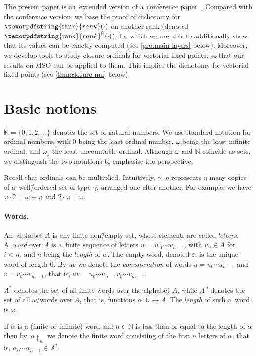 \documentclass[11pt,a4paper]{amsart}
\theoremstyle{plain}
\theoremstyle{definition}
\theoremstyle{defC}
\theoremstyle{thmC}
\theoremstyle{plain}
\numberwithin{equation}{section}
\numberwithin{equation}{section}
\numberwithin{figure}{section}
\newcommand{\ident}[1]{\ensuremath{\texorpdfstring{\mathrm{\mathnm{#1}}}{#1}}\xspace}
\newcommand{\domain}[1]{\ensuremath{\mathbb{#1}}\xspace}
\newcommand{\N}{\domain{N}}
\newcommand{\from}{\colon}
\newcommand{\mathnm}[1]{#1}
\newcommand{\restr}{{\upharpoonright}}
\newcommand{\sR}{\mathsf{R}}
\newcommand{\rank}{\ident{rank}}
\newcommand{\rankR}{\ident{rank}^\sR}
\renewcommand\epsilon\varepsilon
\begin{document}
The present paper is an~extended version of a~conference paper~\cite{dichotomy-stacs}. Compared with the conference version, we base the proof of dichotomy for $\rank(\cdot)$ on another rank (denoted $\rankR(\cdot)$), for which we are able to additionally show that its values can be exactly computed (see \cref{pro:main-layers} below). Moreover, we develop tools to study closure ordinals for vectorial fixed points, so that our results on MSO can be applied to them. This implies the dichotomy for vectorial fixed points (see \cref{thm:closure-mu} below).



\section{Basic notions}\label{sec:basic}

$\N=\{0,1,2,\ldots\}$ denotes the set of natural numbers.
We use standard notation for ordinal numbers, with $0$ being the least ordinal number, $\omega$ being the least infinite ordinal, and $\omega_1$ the least uncountable ordinal.
Although $\omega$ and $\N$ coincide as sets, we distinguish the two notations to emphasise the perspective.

Recall that ordinals can be multiplied.
Intuitively, $\gamma\cdot\eta$ represents $\eta$ many copies of a~well\=/ordered set of type $\gamma$, arranged one after another.
For example, we have $\omega\cdot 2=\omega+\omega$ and $2\cdot\omega=\omega$.


\paragraph*{Words.}
An~alphabet $A$ is any finite non\=/empty set, whose elements are called \emph{letters}.
A~\emph{word} over $A$ is a~finite sequence of letters $w=w_0\cdots w_{n-1}$, with $w_i\in A$ for $i <n$, and $n$ being the \emph{length} of $w$.
The empty word, denoted $\epsilon$, is the unique word of length $0$.
By $u v$ we denote the \emph{concatenation} of words $u=u_0\cdots u_{n-1}$ and $v=v_0\cdots v_{m-1}$, that is, $u v = u_0\cdots u_{n-1} v_0\cdots v_{m-1}$.

$A^\ast$ denotes the set of all finite words over the alphabet $A$, while $A^\omega$ denotes the set of all $\omega$\=/words over $A$, that is, functions $\alpha\from \N\to A$.
The \emph{length} of such a~word is $\omega$.

If $\alpha$ is a (finite or infinite) word and $n\in\N$ is less than or equal to the length of $\alpha$ then by~$\alpha\restr_n$
we denote the finite word consisting of the first $n$ letters of $\alpha$, that is, $\alpha_0\cdots\alpha_{n-1}\in A^\ast$.
\end{document}
